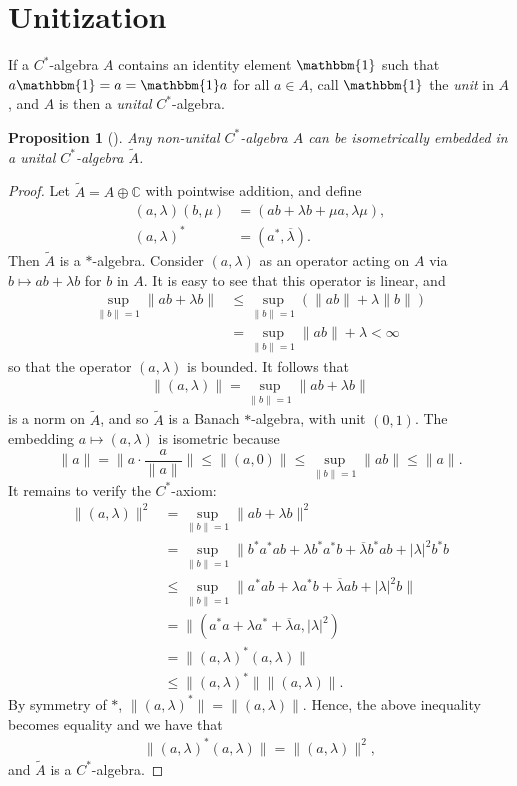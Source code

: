 \documentclass[12pt,a4paper]{report}
\theoremstyle{plain}
\newtheorem*{prop*}{Proposition}
\theoremstyle{definition}
\newcommand{\1}{\mathbbm{1}}
\newcommand{\C}{\mathbb{C}}
\begin{document}
\section{Unitization}
If a $C^\ast$-algebra $A$ contains an identity element $\1$ such that 
$a \1 = a = \1  a$ for all $a \in A$, call $\1$ the \emph{unit} 
in $A$, and $A$ is then a \emph{unital} $C^\ast$-algebra.

\begin{prop*}[{\cite[I.1.3]{davidson96}}]
	Any non-unital $C^\ast$-algebra $A$ can be isometrically embedded in a unital $C^\ast$-algebra 
	$\tilde{A}$.
\end{prop*}
\begin{proof}
	Let $\tilde{A} = A \oplus \C$ with pointwise addition, and define
	\begin{align*}
		(a,\lambda) (b,\mu) &= (ab+\lambda b + \mu a, \lambda \mu),				\\
		(a,\lambda)^\ast &= (a^\ast,\overline{\lambda}).
	\end{align*}
	Then $\tilde{A}$ is a $\ast$-algebra. 
	Consider $(a,\lambda)$ as an operator acting on $A$ via $b\mapsto ab+\lambda b$ for $b$ in $A$. It 
	is easy to see that this operator is linear, and 
	\begin{align*}
				\sup_{\|b\|=1}\|ab+\lambda b\| 
		&\leq 	\sup_{\|b\|=1} (\|ab\|+ \lambda\|b\|)							\\
		&=		\sup_{\|b\|=1} \|ab\|+ \lambda < \infty
	\end{align*}
	so that the operator $(a,\lambda)$ is bounded. It follows that
	\begin{align*}
		\|(a,\lambda)\| = \sup_{\|b\|=1}\|ab+\lambda b\|
	\end{align*}
	is a norm on $\tilde{A}$, and so $\tilde{A}$ is a Banach $\ast$-algebra, with unit $(0,1)$.
	The embedding $a\mapsto(a,\lambda)$ is isometric because 
	\[
		\|a\| = \|a\cdot\frac{a}{\|a\|}\| \leq \|(a,0)\| \leq \sup_{\|b\|=1}{\|ab\|} \leq \|a\|.
	\]
	It remains to verify the $C^\ast$-axiom:
	\begin{align*}
				\|(a,\lambda)\|^2 
		&=		\sup_{\|b\|=1}{\|ab+\lambda b\|^2}								\\
		&=		\sup_{\|b\|=1}{\|b^\ast a^\ast ab 
								+\lambda b^\ast a^\ast b
								+\overline{\lambda}b^\ast a b
								+|\lambda|^2 b^\ast b}							\\
		&\leq	\sup_{\|b\|=1}{\|a^\ast ab 
								+\lambda a^\ast b
								+\overline{\lambda}a b
								+|\lambda|^2 b\|}								\\
		&=		\|(a^\ast a + \lambda a^\ast +\overline{\lambda}a,|\lambda|^2)	\\
		&= 		\|(a,\lambda)^\ast(a,\lambda)\|									\\
		&\leq	\|(a,\lambda)^\ast\| \|(a,\lambda)\|.
	\end{align*}
	By symmetry of $\ast$, $\|(a,\lambda)^\ast\| = \|(a,\lambda)\|$. 
	Hence, the above inequality becomes equality and we have that
	\begin{align*}
		\|(a,\lambda)^\ast(a,\lambda)\| = \|(a,\lambda)\|^2,
	\end{align*}
	and $\tilde A$ is a $C^\ast$-algebra.
\end{proof}
\end{document}
